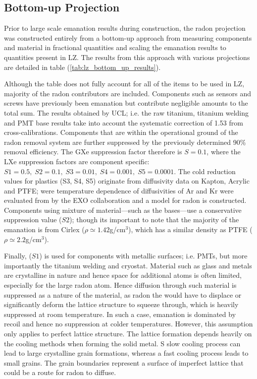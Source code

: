 \subsection{Bottom-up Projection}

Prior to large scale emanation results during construction, the radon projection was constructed entirely from a bottom-up approach from measuring components and material in fractional quantities and scaling the emanation results to quantities present in LZ. The results from this approach with various projections are detailed in table (\ref{tab:lz_bottom_up_results}).

Although the table does not fully account for all of the items to be used in LZ, majority of the radon contributors are included. Components such as sensors and screws have previously been emanation but contribute negligible amounts to the total sum. The results obtained by UCL; i.e. the raw titanium, titanium welding and PMT base results take into account the systematic correction of 1.53 from cross-calibrations. Components that are within the operational ground of the radon removal system are further suppressed by the previously determined 90\% removal efficiency. The GXe suppression factor therefore is $S=0.1$, where the LXe suppression factors are component specific: $S1=0.5,\;S2=0.1,\;S3=0.01,\;S4=0.001,\;S5=0.0001$. The cold reduction values for plastics (S3, S4, S5) originate from diffusivity data on Kapton, Acrylic and PTFE; were temperature dependence of diffusivities of Ar and Kr were evaluated from \cite{Schowalter_2010} by the EXO collaboration and a model for radon is constructed. Components using mixture of material---such as the bases---use a conservative suppression value ($S2$); though its important to note that the majority of the emanation is from Cirlex ($\rho{}\simeq{}1.42$g/cm$^{3}$), which has a similar density as PTFE ($\rho{}\simeq{}2.2$g/cm$^{3}$). 

Finally, ($S1$) is used for components with metallic surfaces; i.e. PMTs, but more importantly the titanium welding and cryostat. Material such as glass and metals are crystalline in nature and hence space for additional atoms is often limited, especially for the large radon atom. Hence diffusion through such material is suppressed as a nature of the material, as radon the would have to displace or significantly deform the lattice structure to squeeze through, which is heavily suppressed at room temperature. In such a case, emanation is dominated by recoil and hence no suppression at colder temperatures. However, this assumption only applies to perfect lattice structure. The lattice formation depends heavily on the cooling methods when forming the solid metal. S slow cooling process can lead to large crystalline grain formations, whereas a fast cooling process leads to small grains. The grain boundaries represent a surface of imperfect lattice that could be a route for radon to diffuse. 

